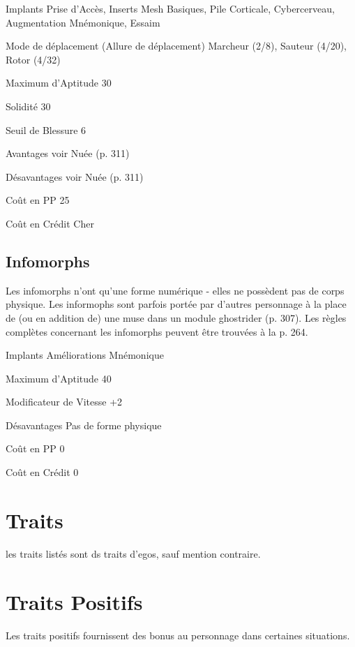 \begin{description*} \item[Implants] Prise d'Accès, Inserts Mesh Basiques, Pile Corticale, Cybercerveau, Augmentation Mnémonique, Essaim\item[Mode de déplacement](Allure de déplacement) Marcheur (2/8), Sauteur (4/20), Rotor (4/32) \item[Maximum d'Aptitude] 30 \item[Solidité] 30 \item[Seuil de Blessure] 6 \item[Avantages] voir Nuée (p. 311) \item[Désavantages] voir Nuée (p. 311) \item[Coût en PP] 25 \item[Coût en Crédit] Cher \end{description*} 

\subsection{Infomorphs} \label{sec:starting-infomorphs} 

Les infomorphs n'ont qu'une forme numérique - elles ne possèdent pas de corps physique. Les informophs sont parfois portée par d'autres personnage à la place de (ou en addition de) une muse dans un module ghostrider (p. 307). Les règles complètes concernant les infomorphs peuvent être trouvées à la p. 264. 

\begin{description*} \item[Implants] Améliorations Mnémonique\item[Maximum d'Aptitude] 40 \item[Modificateur de Vitesse] +2 \item [Désavantages] Pas de forme physique \item[Coût en PP] 0 \item[Coût en Crédit] 0 \end{description*} 

\section{Traits} les traits listés sont ds traits d'egos, sauf mention contraire. 

\section{Traits Positifs} \label{sec:positive-traits} Les traits positifs fournissent des bonus au personnage dans certaines situations. 


